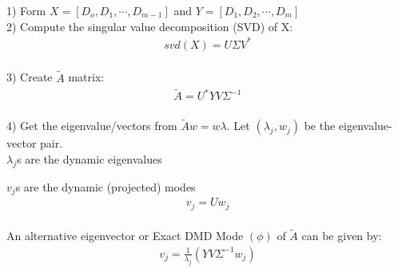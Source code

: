 \documentclass{article}
\begin{document}
1) Form $X=[D_o,D_1, \cdots ,D_{m-1}]$ and $Y=[D_1,D_2, \cdots,D_m]$\\

2) Compute the singular value decomposition (SVD) of X:
\begin{align*}
svd(X) = U\Sigma V^*
\end{align*}\\

3) Create $\tilde{A}$ matrix:
\begin{align*}
\tilde{A}=U^*YV\Sigma ^{-1}
\end{align*}\\

4) Get the eigenvalue/vectors from $\tilde{A}w=w\lambda$. Let $(\lambda_j,w_j)$ be the eigenvalue-vector pair.\\

$\lambda_j$s are the dynamic eigenvalues\

$v_j$s are the dynamic (projected) modes\\

\begin{align*}
v_j=Uw_j
\end{align*}\\

An alternative eigenvector or Exact DMD Mode $(\phi)$ of $\tilde{A}$ can be given by:
\begin{align*}
v_j = \frac{1}{\lambda_j}(YV\Sigma^{-1}w_j)
\end{align*}

%
%
\printbibliography
\end{document}
